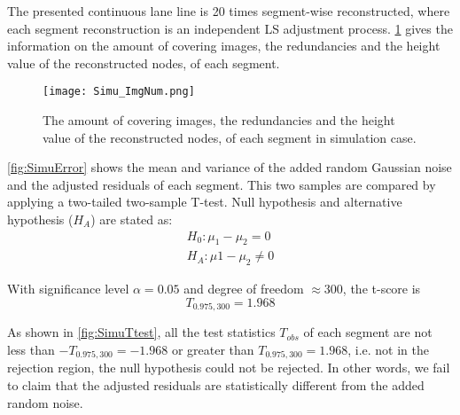 

The presented continuous lane line is 20 times segment-wise reconstructed, where each segment reconstruction is an independent LS adjustment process. \cref{fig:SimuImgNum} gives the information on the amount of covering images, the redundancies and the height value of the reconstructed nodes, of each segment.

\begin{figure}
  \centering
  \texttt{[image: Simu\_ImgNum.png]}
  \caption{\small The amount of covering images, the redundancies and the height value of the reconstructed nodes, of each segment in simulation case.}
  \label{fig:SimuImgNum}
\end{figure}

\cref{fig:SimuError} shows the mean and variance of the added random Gaussian noise and the adjusted residuals of each segment. This two samples are compared by applying a two-tailed two-sample T-test. Null hypothesis and alternative hypothesis ($H_A$) are stated as:
\begin{equation*}
\begin{split}
H_0: \mu_1-\mu_2=0\\
H_A: \mu1-\mu_2\neq0
\end{split}
\end{equation*}

With significance level $\alpha=0.05$ and degree of freedom $\approx300$, the t-score is 
\begin{equation*}
T_{0.975,300}=1.968
\end{equation*}

As shown in \cref{fig:SimuTtest}, all the test statistics $T_{obs}$ of each segment are not less than $-T_{0.975,300}=-1.968$ or greater than $T_{0.975,300}=1.968$, i.e. not in the rejection region, the null hypothesis could not be rejected. In other words, we fail to claim that the adjusted residuals are statistically different from the added random noise.

